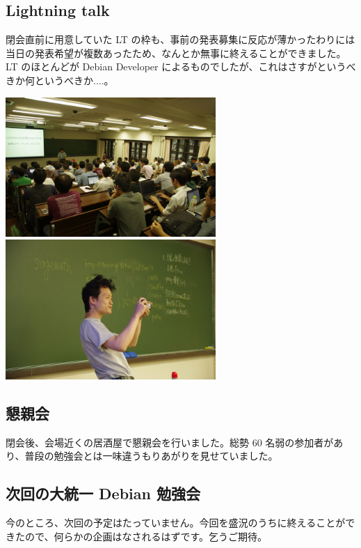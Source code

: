 \documentclass[mingoth,a4paper]{jsarticle}
\begin{document}
\subsection{Lightning talk}
閉会直前に用意していた LT の枠も、事前の発表募集に反応が薄かったわりには当日の発表希望が複数あったため、なんとか無事に終えることができました。
LT のほとんどが Debian Developer によるものでしたが、これはさすがというべきか何というべきか....。

\includegraphics[width=8cm]{image201206/gum2012-lt.jpg}
\includegraphics[width=8cm]{image201206/gum2012-closing.jpg}

\subsection{懇親会}

閉会後、会場近くの居酒屋で懇親会を行いました。総勢 60 名弱の参加者があり、普段の勉強会とは一味違うもりあがりを見せていました。

\subsection{次回の大統一 Debian 勉強会}

今のところ、次回の予定はたっていません。今回を盛況のうちに終えることができたので、何らかの企画はなされるはずです。乞うご期待。



\end{document}
